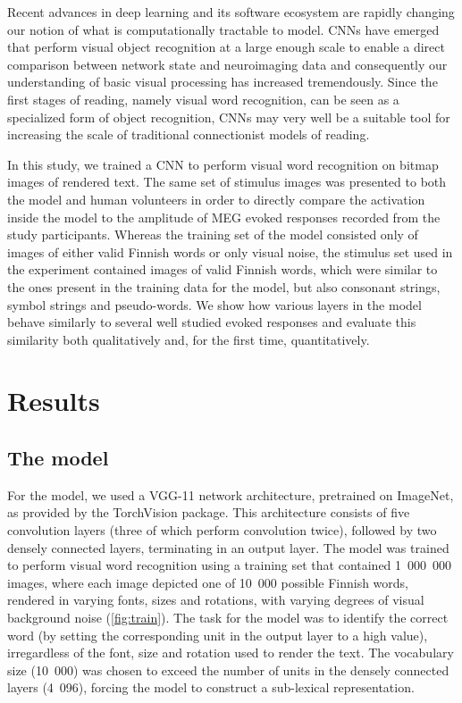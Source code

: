 \documentclass[a4paper, 10pt]{vanvliet_paper}
\begin{document}
Recent advances in deep learning and its software ecosystem are rapidly changing our notion of what is computationally tractable to model\cite{Richards2019}.
\Glspl{CNN} have emerged that perform visual object recognition at a large enough scale to enable a direct comparison between network state and neuroimaging data\cite{Schrimpf2018, Devereux2018, Yamins2016} and consequently our understanding of basic visual processing has increased tremendously\cite{Lindsay2020}.
Since the first stages of reading, namely visual word recognition, can be seen as a specialized form of object recognition, \glspl{CNN} may very well be a suitable tool for increasing the scale of traditional connectionist models of reading.

In this study, we trained a \gls{CNN} to perform visual word recognition on bitmap images of rendered text.
The same set of stimulus images was presented to both the model and human volunteers in order to directly compare the activation inside the model to the amplitude of \gls{MEG} evoked responses recorded from the study participants.
Whereas the training set of the model consisted only of images of either valid Finnish words or only visual noise, the stimulus set used in the experiment contained images of valid Finnish words, which were similar to the ones present in the training data for the model, but also consonant strings, symbol strings and pseudo-words.
We show how various layers in the model behave similarly to several well studied evoked responses and evaluate this similarity both qualitatively and, for the first time, quantitatively.

\section{Results}

\subsection{The model}
For the model, we used a \textsc{VGG}-11\cite{Szegedy2015} network architecture, pretrained on ImageNet\cite{Russakovsky2015}, as provided by the TorchVision package\cite{Marcel2010}.
This architecture consists of five convolution layers (three of which perform convolution twice), followed by two densely connected layers, terminating in an output layer.
The model was trained to perform visual word recognition using a training set that contained 1~000~000 images, where each image depicted one of 10~000 possible Finnish words, rendered in varying fonts, sizes and rotations, with varying degrees of visual background noise (\autoref{fig:train}).
The task for the model was to identify the correct word (by setting the corresponding unit in the output layer to a high value), irregardless of the font, size and rotation used to render the text.
The vocabulary size (10~000) was chosen to exceed the number of units in the densely connected layers (4~096), forcing the model to construct a sub-lexical representation.
\end{document}
